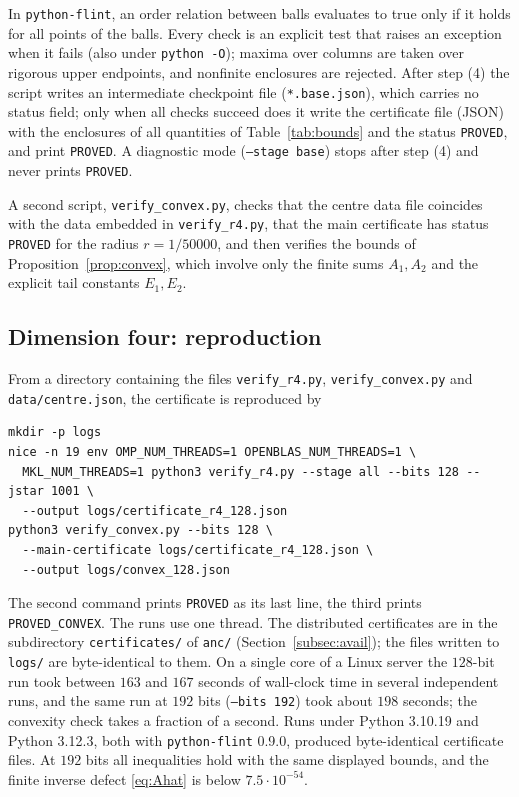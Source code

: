 \documentclass[11pt]{amsart}
\theoremstyle{definition}
\theoremstyle{remark}
\numberwithin{equation}{section}
\begin{document}
In \texttt{python-flint}, an order relation between balls evaluates to true only if it holds for all points of the balls. Every check is an explicit test that raises an exception when it fails (also under \texttt{python -O}); maxima over columns are taken over rigorous upper endpoints, and nonfinite enclosures are rejected. After step (4) the script writes an intermediate checkpoint file (\texttt{*.base.json}), which carries no status field; only when all checks succeed does it write the certificate file (JSON) with the enclosures of all quantities of Table~\ref{tab:bounds} and the status \texttt{PROVED}, and print \texttt{PROVED}. A diagnostic mode (\texttt{--stage base}) stops after step (4) and never prints \texttt{PROVED}.

A second script, \texttt{verify\_convex.py}, checks that the centre data file coincides with the data embedded in \texttt{verify\_r4.py}, that the main certificate has status \texttt{PROVED} for the radius $r=1/50000$, and then verifies the bounds of Proposition~\ref{prop:convex}, which involve only the finite sums $A_1,A_2$ and the explicit tail constants $E_1,E_2$.

\subsection{Dimension four: reproduction}
\begin{sloppypar}
From a directory containing the files \texttt{verify\_r4.py}, \texttt{verify\_convex.py} and \texttt{data/centre.json}, the certificate is reproduced by
\end{sloppypar}
\begin{verbatim}
mkdir -p logs
nice -n 19 env OMP_NUM_THREADS=1 OPENBLAS_NUM_THREADS=1 \
  MKL_NUM_THREADS=1 python3 verify_r4.py --stage all --bits 128 --jstar 1001 \
  --output logs/certificate_r4_128.json
python3 verify_convex.py --bits 128 \
  --main-certificate logs/certificate_r4_128.json \
  --output logs/convex_128.json
\end{verbatim}
The second command prints \texttt{PROVED} as its last line, the third prints \texttt{PROVED\_CONVEX}. The runs use one thread. The distributed certificates are in the subdirectory \texttt{certificates/} of \texttt{anc/} (Section~\ref{subsec:avail}); the files written to \texttt{logs/} are byte-identical to them. On a single core of a Linux server the $128$-bit run took between $163$ and $167$ seconds of wall-clock time in several independent runs, and the same run at $192$ bits (\texttt{--bits 192}) took about $198$ seconds; the convexity check takes a fraction of a second. Runs under Python 3.10.19 and Python 3.12.3, both with \texttt{python-flint} 0.9.0, produced byte-identical certificate files. At $192$ bits all inequalities hold with the same displayed bounds, and the finite inverse defect \eqref{eq:Ahat} is below $7.5\cdot10^{-54}$.
\end{document}
